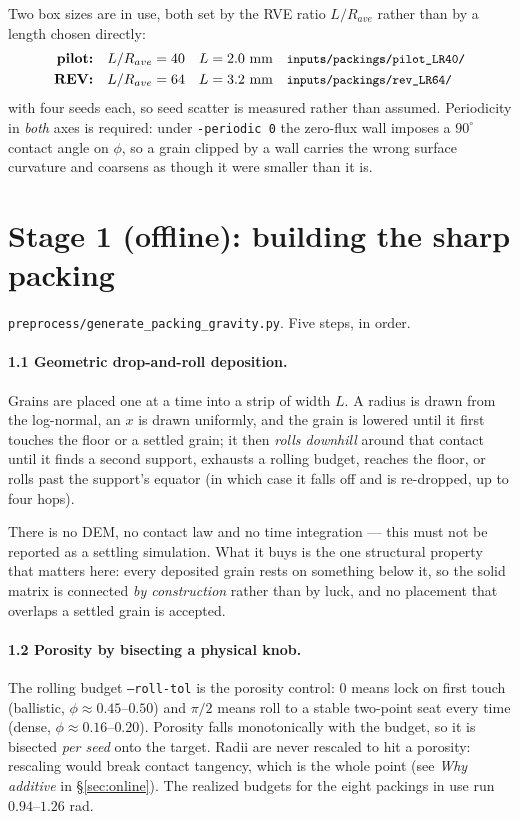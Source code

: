 \documentclass[11pt]{article}
\newcommand{\code}[1]{\texttt{\small #1}}
\begin{document}
\noindent
Two box sizes are in use, both set by the RVE ratio $L/R_{ave}$ rather than
by a length chosen directly:
%
\begin{align*}
  \textbf{pilot:} && L/R_{ave} &= 40 && L = 2.0\ \text{mm}  && \text{\code{inputs/packings/pilot\_LR40/}} \\
  \textbf{REV:}   && L/R_{ave} &= 64 && L = 3.2\ \text{mm}  && \text{\code{inputs/packings/rev\_LR64/}}
\end{align*}
%
with four seeds each, so seed scatter is measured rather than assumed.
Periodicity in \emph{both} axes is required: under \code{-periodic 0} the
zero-flux wall imposes a $90^\circ$ contact angle on $\phi$, so a grain
clipped by a wall carries the wrong surface curvature and coarsens as
though it were smaller than it is.

\section{Stage 1 (offline): building the sharp packing}

\code{preprocess/generate\_packing\_gravity.py}. Five steps, in order.

\paragraph{1.1 Geometric drop-and-roll deposition.}
Grains are placed one at a time into a strip of width $L$. A radius is
drawn from the log-normal, an $x$ is drawn uniformly, and the grain is
lowered until it first touches the floor or a settled grain; it then
\emph{rolls downhill} around that contact until it finds a second support,
exhausts a rolling budget, reaches the floor, or rolls past the support's
equator (in which case it falls off and is re-dropped, up to four hops).

There is no DEM, no contact law and no time integration --- this must not
be reported as a settling simulation. What it buys is the one structural
property that matters here: every deposited grain rests on something below
it, so the solid matrix is connected \emph{by construction} rather than by
luck, and no placement that overlaps a settled grain is accepted.

\paragraph{1.2 Porosity by bisecting a physical knob.}
The rolling budget \code{--roll-tol} is the porosity control:
$0$ means lock on first touch (ballistic, $\phi \approx 0.45$--$0.50$) and
$\pi/2$ means roll to a stable two-point seat every time (dense,
$\phi \approx 0.16$--$0.20$). Porosity falls monotonically with the budget,
so it is bisected \emph{per seed} onto the target. Radii are never rescaled
to hit a porosity: rescaling would break contact tangency, which is the
whole point (see \emph{Why additive} in \S\ref{sec:online}). The realized budgets for the eight
packings in use run $0.94$--$1.26$ rad.
\end{document}
